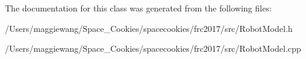 The documentation for this class was generated from the following files\+:\begin{DoxyCompactItemize}
\item 
/\+Users/maggiewang/\+Space\+\_\+\+Cookies/spacecookies/frc2017/src/Robot\+Model.\+h\item 
/\+Users/maggiewang/\+Space\+\_\+\+Cookies/spacecookies/frc2017/src/Robot\+Model.\+cpp\end{DoxyCompactItemize}
